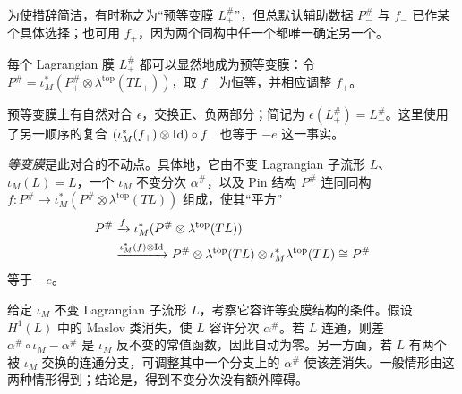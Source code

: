 为使措辞简洁，有时称之为“预等变膜 $L_+^\#$”，但总默认辅助数据 $P_-^\#$ 与 $f_-$ 已作某个具体选择；也可用 $f_+$，因为两个同构中任一个都唯一确定另一个。
\begin{note}\label{st:14.1}
每个 Lagrangian 膜 $L_+^\#$ 都可以显然地成为预等变膜：令 $P_-^\#=\iota_M^*(P_+^\#\otimes\lambda^{\mathrm{top}}(TL_+))$，取 $f_-$ 为恒等，并相应调整 $f_+$。
\end{note}
预等变膜上有自然对合 $\epsilon$，交换正、负两部分；简记为 $\epsilon(L_+^\#)=L_-^\#$。这里使用了另一顺序的复合 $(\iota_M^*(f_+)\otimes\operatorname{Id})\circ f_-$ 也等于 $-e$ 这一事实。
\begin{definition*}
\emph{等变膜}是此对合的不动点。具体地，它由不变 Lagrangian 子流形 $L$、$\iota_M(L)=L$，一个 $\iota_M$ 不变分次 $\alpha^\#$，以及 Pin 结构 $P^\#$ 连同同构 $f:P^\#\to\iota_M^*(P^\#\otimes\lambda^{\mathrm{top}}(TL))$ 组成，使其“平方”
\begin{equation}\label{eq:14.2}
\begin{aligned}
P^\#&\xrightarrow{f}\iota_M^*(P^\#\otimes\lambda^{\mathrm{top}}(TL))\\
&\xrightarrow{\iota_M^*(f)\otimes\operatorname{Id}}P^\#\otimes\lambda^{\mathrm{top}}(TL)\otimes\iota_M^*\lambda^{\mathrm{top}}(TL)\cong P^\#
\end{aligned}
\end{equation}
等于 $-e$。
\end{definition*}
给定 $\iota_M$ 不变 Lagrangian 子流形 $L$，考察它容许等变膜结构的条件。假设 $H^1(L)$ 中的 Maslov 类消失，使 $L$ 容许分次 $\alpha^\#$。若 $L$ 连通，则差 $\alpha^\#\circ\iota_M-\alpha^\#$ 是 $\iota_M$ 反不变的常值函数，因此自动为零。另一方面，若 $L$ 有两个被 $\iota_M$ 交换的连通分支，可调整其中一个分支上的 $\alpha^\#$ 使该差消失。一般情形由这两种情形得到；结论是，得到不变分次没有额外障碍。

